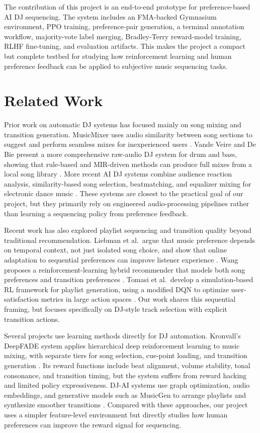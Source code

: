 \documentclass{article}
\begin{document}
The contribution of this project is an end-to-end prototype for preference-based AI DJ sequencing. The system includes an FMA-backed Gymnasium environment, PPO training, preference-pair generation, a terminal annotation workflow, majority-vote label merging, Bradley-Terry reward-model training, RLHF fine-tuning, and evaluation artifacts. This makes the project a compact but complete testbed for studying how reinforcement learning and human preference feedback can be applied to subjective music sequencing tasks.

\section{Related Work}

Prior work on automatic DJ systems has focused mainly on song mixing and transition generation. MusicMixer uses audio similarity between song sections to suggest and perform seamless mixes for inexperienced users \cite{musicmixer}. Vande Veire and De Bie present a more comprehensive raw-audio DJ system for drum and bass, showing that rule-based and MIR-driven methods can produce full mixes from a local song library \cite{rawaudio}. More recent AI DJ systems combine audience reaction analysis, similarity-based song selection, beatmatching, and equalizer mixing for electronic dance music \cite{aidj}. These systems are closest to the practical goal of our project, but they primarily rely on engineered audio-processing pipelines rather than learning a sequencing policy from preference feedback.

Recent work has also explored playlist sequencing and transition quality beyond traditional recommendation. Liebman et al.\ argue that music preference depends on temporal context, not just isolated song choice, and show that online adaptation to sequential preferences can improve listener experience \cite{rightmusic}. Wang proposes a reinforcement-learning hybrid recommender that models both song preferences and transition preferences \cite{hybridrec}. Tomasi et al.\ develop a simulation-based RL framework for playlist generation, using a modified DQN to optimize user-satisfaction metrics in large action spaces \cite{playlist}. Our work shares this sequential framing, but focuses specifically on DJ-style track selection with explicit transition actions.

Several projects use learning methods directly for DJ automation. Kronvall's DeepFADE system applies hierarchical deep reinforcement learning to music mixing, with separate tiers for song selection, cue-point loading, and transition generation \cite{deepfade}. Its reward functions include beat alignment, volume stability, tonal consonance, and transition timing, but the system suffers from reward hacking and limited policy expressiveness. DJ-AI systems use graph optimization, audio embeddings, and generative models such as MusicGen to arrange playlists and synthesize smoother transitions \cite{djai_sorting,djai_alignment}. Compared with these approaches, our project uses a simpler feature-level environment but directly studies how human preferences can improve the reward signal for sequencing.
\end{document}

